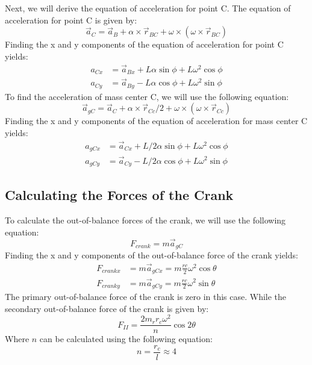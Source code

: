 \documentclass[12pt, titlepage]{article}
\begin{document}
Next, we will derive the equation of acceleration for point C. The equation of
acceleration for point C is given by:
\begin{equation}
    \label{eq:accc}
    \vec{a}_C = \vec{a}_B + \alpha \times \vec{r}_{BC} +
      \omega \times (\omega \times \vec{r}_{BC})
\end{equation}
Finding the x and y components of the equation of acceleration for point C
yields:
\begin{equation}
    \label{eq:acccxy}
    \begin{split}
        a_{Cx} &= \vec{a}_{Bx} + L\alpha\sin\phi + L\omega^2\cos\phi\\
        a_{Cy} &= \vec{a}_{By} - L\alpha\cos\phi + L\omega^2\sin\phi
    \end{split}
\end{equation}
To find the acceleration of mass center C, we will use the following equation:
\begin{equation}
    \label{eq:accccenter}
    \vec{a}_{gC} = \vec{a}_C + \alpha \times \vec{r}_{Cc}/2 +
      \omega \times (\omega \times \vec{r}_{Cc})
\end{equation}
Finding the x and y components of the equation of acceleration for mass center
C yields:
\begin{equation}
    \label{eq:accccenterxy}
    \begin{split}
        a_{gCx} &= \vec{a}_{Cx} + L/2\alpha\sin\phi + L\omega^2\cos\phi\\
        a_{gCy} &= \vec{a}_{Cy} - L/2\alpha\cos\phi + L\omega^2\sin\phi
    \end{split}
\end{equation}
\subsection{Calculating the Forces of the Crank}
To calculate the out-of-balance forces of the crank, we will use the following
equation:
\begin{equation}
    \label{eq:crankforce}
    F_{crank} = m\vec{a}_{gC}
\end{equation}
Finding the x and y components of the out-of-balance force of the crank yields:
\begin{equation}
    \label{eq:crankforcexy}
    \begin{split}
      F_{crankx} &= m\vec{a}_{gCx} = m \frac{rc}{2} \omega^2 \cos\theta\\
      F_{cranky} &= m\vec{a}_{gCy} = m \frac{rc}{2} \omega^2 \sin\theta
    \end{split}
\end{equation}
The primary out-of-balance force of the crank is zero in this case. While
the secondary out-of-balance force of the crank is given by:
\begin{equation}
    \label{eq:crankforce2}
    F_{II} = \displaystyle\frac{2m_rr_c\omega^2}{n} \cos2\theta
\end{equation}
Where $n$ can be calculated using the following equation:
\begin{equation}
    \label{eq:crankforce2n}
    n = \displaystyle\frac{r_c}{l} \approx 4
\end{equation}
\end{document}
